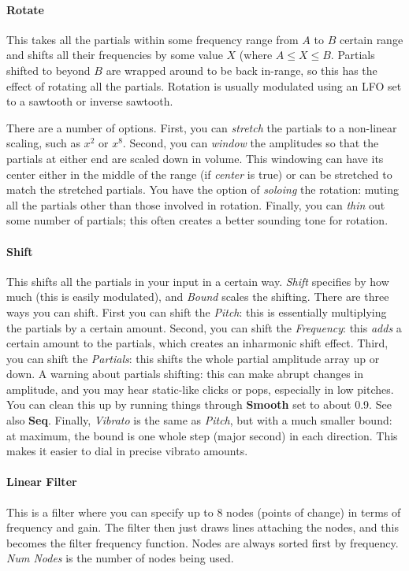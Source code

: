 \documentclass{article}
\begin{document}
\paragraph{Rotate}  This takes all the partials within some frequency range from \(A\) to \(B\) certain range and shifts all their frequencies by some value \(X\) (where \(A \leq X \leq B\).  Partials shifted to beyond \(B\) are wrapped around to be back in-range, so this has the effect of rotating all the partials.  Rotation is usually modulated using an LFO set to a sawtooth or inverse sawtooth.

There are a number of options.  First, you can {\it stretch} the partials to a non-linear scaling, such as \(x^2\) or \(x^8\).  Second, you can {\it window} the amplitudes so that the partials at either end are scaled down in volume.  This windowing can have its center either in the middle of the range (if {\it center} is true) or can be stretched to match the stretched partials.  You have the option of {\it soloing} the rotation: muting all the partials other than those involved in rotation.  Finally, you can {\it thin} out some number of partials; this often creates a better sounding tone for rotation.
 
\paragraph{Shift} This shifts all the partials in your input in a certain way.  {\it Shift} specifies by how much (this is easily modulated), and {\it Bound} scales the shifting.  There are three ways you can shift.  First you can shift the {\it Pitch}: this is essentially multiplying the partials by a certain amount.  Second, you can shift the {\it Frequency}: this {\it adds} a certain amount to the partials, which creates an inharmonic shift effect.  Third, you can shift the {\it Partials}: this shifts the whole partial amplitude array up or down.  A warning about partials shifting: this can make abrupt changes in amplitude, and you may hear static-like clicks or pops, especially in low pitches.  You can clean this up by running things through {\bf Smooth} set to about 0.9. See also {\bf Seq}.  Finally, {\it Vibrato} is the same as {\it Pitch}, but with a much smaller bound: at maximum, the bound is one whole step (major second) in each direction.  This makes it easier to dial in precise vibrato amounts.

\paragraph{Linear Filter} This is a filter where you can specify up to 8 nodes (points of change) in terms of frequency and gain.  The filter then just draws lines attaching the nodes, and this becomes the filter frequency function.  Nodes are always sorted first by frequency.  {\it Num Nodes} is the number of nodes being used.
\end{document}
